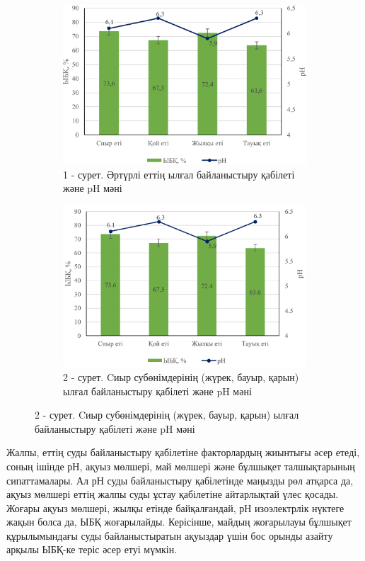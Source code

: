 \begin{figure}[H]
	\centering
	\begin{subfigure}{0.48\textwidth}
		\centering
		\includegraphics[width=\textwidth]{media/pish4/image1}
		\caption*{1 - сурет. Әртүрлі еттің ылғал байланыстыру қабілеті және pH мәні}
	\end{subfigure}
	\begin{subfigure}{0.48\textwidth}
		\centering
		\includegraphics[width=\textwidth]{media/pish/image5}
		\caption*{2 - сурет. Cиыр субөнімдерінің (жүрек, бауыр, қарын) ылғал байланыстыру қабілеті және pH мәні}
	\end{subfigure}
\end{figure}

\begin{multicols}{2}
Жалпы, еттің суды байланыстыру қабілетіне факторлардың жиынтығы әсер
етеді, соның ішінде рН, ақуыз мөлшері, май мөлшері және бұлшықет
талшықтарының сипаттамалары. Ал рН суды байланыстыру қабілетінде маңызды
рөл атқарса да, ақуыз мөлшері еттің жалпы суды ұстау қабілетіне
айтарлықтай үлес қосады. Жоғары ақуыз мөлшері, жылқы етінде
байқалғандай, рН изоэлектрлік нүктеге жақын болса да, ЫБҚ жоғарылайды.
Керісінше, майдың жоғарылауы бұлшықет құрылымындағы суды байланыстыратын
ақуыздар үшін бос орынды азайту арқылы ЫБҚ-ке теріс әсер етуі мүмкін.
\end{multicols}

